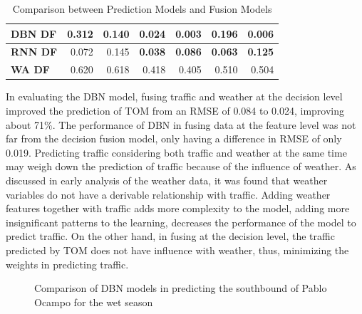 \begin{table}[!t]
\begin{tabular}{|l|r|r|r|r|r|r|}
\textbf{DBN DF}                & 0.312                              & 0.140                             & 0.024                              & 0.003                             & 0.196                              & 0.006                             \\ \hline
\textbf{RNN DF}                & 0.072                              & 0.145                             & \textbf{0.038}                     & \textbf{0.086}                    & \textbf{0.063}                     & \textbf{0.125}                    \\ \hline
\textbf{WA DF}                 & 0.620                              & 0.618                             & 0.418                              & 0.405                             & 0.510                              & 0.504                             \\ \hline
\end{tabular}
\caption{Comparison between Prediction Models and Fusion Models}
\label{table:fusion_results}
\end{table}

In evaluating the DBN model, fusing traffic and weather at the decision level improved the prediction of TOM from an RMSE of 0.084 to 0.024, improving about 71\%. The performance of DBN in fusing data at the feature level was not far from the decision fusion model, only having a difference in RMSE of only 0.019. Predicting traffic considering both traffic and weather at the same time may weigh down the prediction of traffic because of the influence of weather. As discussed in early analysis of the weather data, it was found that weather variables do not have a derivable relationship with traffic. Adding weather features together with traffic adds more complexity to the model, adding more insignificant patterns to the learning, decreases the performance of the model to predict traffic. On the other hand, in fusing at the decision level, the traffic predicted by TOM does not have influence with weather, thus, minimizing the weights in predicting traffic. 


\begin{figure}[!t]
  \centering
  \captionsetup{justification=centering}
  \caption{Comparison of DBN models in predicting the southbound of Pablo Ocampo for the wet season}
  \label{fig:dbn_comp_pocampo}
\end{figure}

